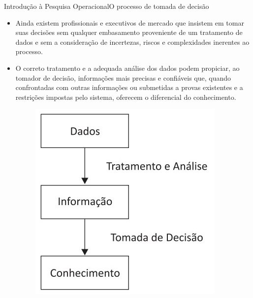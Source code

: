 \documentclass[t]{beamer}
\begin{document}
\begin{ftst}{Introdução à Pesquisa Operacional}{O processo de tomada de decisão}
\small
\begin{itemize}
    \item Ainda existem profissionais e executivos de mercado que insistem em tomar suas decisões sem qualquer embasamento proveniente de um tratamento de dados e sem a consideração de incertezas, riscos e complexidades inerentes ao processo.
    \item O correto tratamento e a adequada análise dos dados podem propiciar, ao tomador de decisão, informações mais precisas e confiáveis que, quando confrontadas com outras informações ou submetidas a provas existentes e a restrições impostas pelo sistema, oferecem o diferencial do conhecimento.
    \begin{figure}
        \centering
        \includegraphics[scale=0.3]{Figuras/conhecimento.jpg}
    \end{figure}
    \end{itemize}

\end{ftst}

\end{document}
